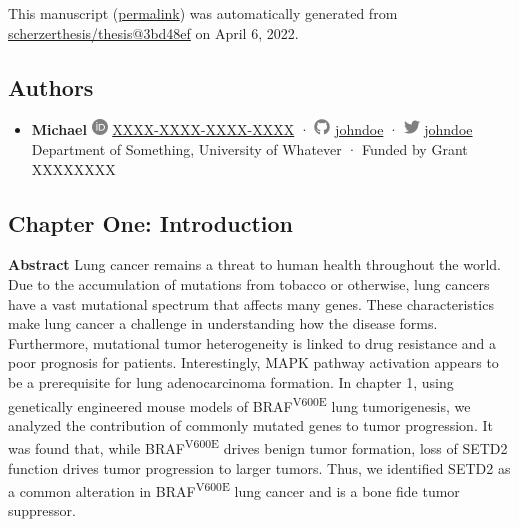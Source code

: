 This manuscript
(\href{https://scherzerthesis.github.io/thesis/v/3bd48ef9b7e8de9373449f399d612df876396338/}{permalink})
was automatically generated
from \href{https://github.com/scherzerthesis/thesis/tree/3bd48ef9b7e8de9373449f399d612df876396338}{scherzerthesis/thesis@3bd48ef}
on April 6, 2022.

\hypertarget{authors}{%
\subsection{Authors}\label{authors}}

\begin{itemize}
\tightlist
\item
  \textbf{Michael}
  \includegraphics[width=0.16667in,height=0.16667in]{images/orcid.svg}
  \href{https://orcid.org/XXXX-XXXX-XXXX-XXXX}{XXXX-XXXX-XXXX-XXXX}
  · \includegraphics[width=0.16667in,height=0.16667in]{images/github.svg}
  \href{https://github.com/johndoe}{johndoe}
  · \includegraphics[width=0.16667in,height=0.16667in]{images/twitter.svg}
  \href{https://twitter.com/johndoe}{johndoe}
  Department of Something, University of Whatever
  · Funded by Grant XXXXXXXX
\end{itemize}

\hypertarget{chapter-one-introduction}{%
\subsection{Chapter One: Introduction}\label{chapter-one-introduction}}

\textbf{Abstract}
Lung cancer remains a threat to human health throughout the world. Due to the accumulation of mutations from tobacco or otherwise, lung cancers have a vast mutational spectrum that affects many genes. These characteristics make lung cancer a challenge in understanding how the disease forms. Furthermore, mutational tumor heterogeneity is linked to drug resistance and a poor prognosis for patients. Interestingly, MAPK pathway activation appears to be a prerequisite for lung adenocarcinoma formation. In chapter 1, using genetically engineered mouse models of BRAF\textsuperscript{V600E} lung tumorigenesis, we analyzed the contribution of commonly mutated genes to tumor progression. It was found that, while BRAF\textsuperscript{V600E} drives benign tumor formation, loss of SETD2 function drives tumor progression to larger tumors. Thus, we identified SETD2 as a common alteration in BRAF\textsuperscript{V600E} lung cancer and is a bone fide tumor suppressor.

